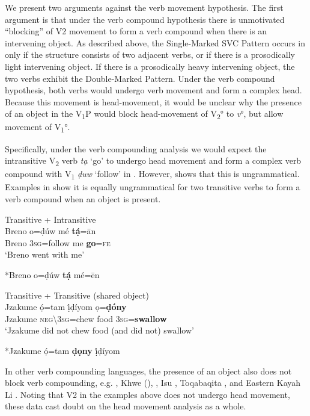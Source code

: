 \documentclass[output=paper]{langsci/langscibook}
\begin{document}
We present two arguments against the verb movement hypothesis. The first argument is that under the verb compound hypothesis there is unmotivated “blocking” of V2 movement to form a verb compound when there is an intervening object. As described above, the Single-Marked SVC Pattern occurs in  only if the structure consists of two adjacent verbs, or if there is a prosodically light intervening object. If there is a prosodically heavy intervening object, the two verbs exhibit the Double-Marked Pattern. Under the verb compound hypothesis, both verbs would undergo verb movement and form a complex head. Because this movement is head-movement, it would be unclear why the presence of an object in the V\textsubscript{1}P would block head-movement of V\textsubscript{2}° to \textit{v}°, but allow movement of V\textsubscript{1}°.

Specifically, under the verb compounding analysis we would expect the intransitive V\textsubscript{2} verb \textit{tạ} ‘go’ to undergo head movement and form a complex verb compound with V\textsubscript{1} \textit{ḍuw} ‘follow’ in . However,  shows that this is ungrammatical. Examples in  show it is equally ungrammatical for two transitive verbs to form a verb compound when an object is present. 

\ea\label{ex:rolle:tran}
{Transitive + Intransitive}\\
\ea\label{ex:rolle:37}
\gll   Breno   o=ḍúw    mé   \textbf{tạ́}=ān\\
     Breno   3\textsc{sg}=follow   me   \textbf{go}=\textsc{fe}\\
\glt ‘Breno went with me’ \citep[115]{Kari2004}

\ex\label{ex:rolle:38}
  *Breno o=ḍúw  \textbf{tạ́}  mé=ēn\\
\z
\z 

\ea\label{ex:rolle:so}
{Transitive + Transitive (shared object)}\\
   \ea\label{ex:rolle:39}
\gll   Jzakume   ọ́=tam      ị́ḍíyom  ọ=\textbf{ḍóny}\\
     Jzakume  \textsc{neg{\textbackslash}}3\textsc{sg}=chew  food  3\textsc{sg}=\textbf{swallow}\\
\glt ‘Jzakume did not chew food (and did not) swallow’ \citep[110]{Kari2004}

\ex\label{ex:rolle:40}
   *Jzakume  ọ́=tam  \textbf{ḍọny}  ị́ḍíyom\\
\z
\z 


In other verb compounding languages, the presence of an object also does not block verb compounding, e.g.  \citep{Collins2002}, Khwe (\citealt{KilianHatz2006}),  \citep{Lord1975}, Isu \citep{Kießling2011}, Toqabaqita \citep{Lichtenberk2006,Lichtenberk2008}, and Eastern Kayah Li \citep{Solnit2006}. Noting that V2 in the examples above does not undergo head movement, these data cast doubt on the head movement analysis as a whole.
\end{document}
